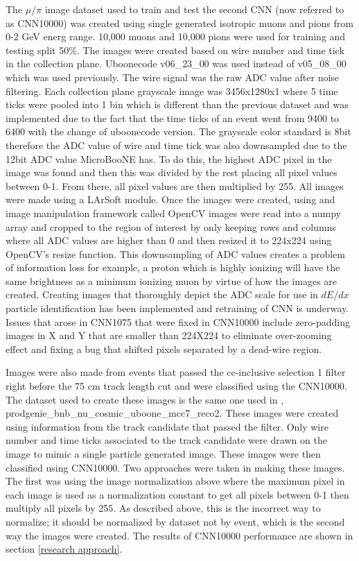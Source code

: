The $\mu/\pi$ image dataset used to train and test the second CNN (now referred to as CNN10000) was created using single generated isotropic muons and pions from 0-2 GeV energ range. 10,000 muons and 10,000 pions were used for training and testing split 50\%. The images were created based on wire number and time tick in the collection plane. Uboonecode v06{\_}23{\_}00 was used instead of v05{\_}08{\_}00 which was used previously. The wire signal was the raw ADC value after noise filtering. Each collection plane grayscale image was 3456x1280x1 where 5 time ticks were pooled into 1 bin which is different than the previous dataset and was implemented due to the fact that the time ticks of an event went from 9400 to 6400 with the change of uboonecode version. The grayscale color standard is 8bit therefore the ADC value of wire and time tick was also downsampled due to the 12bit ADC value MicroBooNE has. To do this, the highest ADC pixel in the image was found and then this was divided by the rest placing all pixel values between 0-1. From there, all pixel values are then multiplied by 255. All images were made using a LArSoft module. Once the images were created, using and image manipulation framework called OpenCV images were read into a numpy array and cropped to the region of interest by only keeping rows and columns where all ADC values are higher than 0 and then resized it to 224x224 using OpenCV's resize function. This downsampling of ADC values creates a problem of information loss for example, a proton which is highly ionizing will have the same brightness as a minimum ionizing muon by virtue of how the images are created. Creating images that thoroughly depict the ADC scale for use in $dE/dx$ particle identification has been implemented and retraining of CNN is underway.
Issues that arose in CNN1075 that were fixed in CNN10000 include zero-padding images in X and Y that are smaller than 224X224 to eliminate over-zooming effect and fixing a bug that shifted pixels separated by a dead-wire region. 

Images were also made from events that passed the cc-inclusive selection 1 filter right before the 75 cm track length cut and were classified using the CNN10000. The dataset used to create these images is the same one used in \cite{cc-inclusive}, prodgenie{\_}bnb{\_}nu{\_}cosmic{\_}uboone{\_}mcc7{\_}reco2. These images were created using information from the track candidate that passed the filter. Only wire number and time ticks associated to the track candidate were drawn on the image to mimic a single particle generated image. These images were then classified using CNN10000. Two approaches were taken in making these images. The first was using the image normalization above where the maximum pixel in each image is used as a normalization constant to get all pixels between 0-1 then multiply all pixels by 255. As described above, this is the incorrect way to normalize; it should be normalized by dataset not by event, which is the second way the images were created. The results of CNN10000 performance are shown in section \ref{research approach}. 


